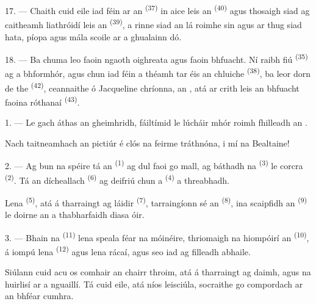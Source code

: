 17. --- Chaith cuid eile iad féin ar an 
\textsuperscript{(37)} in aice leis an  \textsuperscript{(40)}
agus thosaigh siad ag caitheamh liathróidí leis an 
\textsuperscript{(39)}, a rinne siad an lá roimhe sin agus ar thug siad hata, píopa
agus mála scoile ar a ghualainn dó.

18. --- Ba chuma leo faoin ngaoth oighreata agus faoin bhfuacht. Ní raibh fiú
 \textsuperscript{(35)} ag a bhformhór, agus chun iad féin a théamh
tar éis an chluiche  \textsuperscript{(38)}, ba leor
dorn de  the \textsuperscript{(42)}, ceannaithe ó Jacqueline
chríonna, an , atá ar crith leis an bhfuacht faoina
 róthanaí \textsuperscript{(43)}.

\VUsaut{3.0mm}
\VUsaut{3.0mm}

\VUsaut{4.0mm}

1. --- Le gach áthas an gheimhridh, fáiltímid le lúcháir mhór roimh fhilleadh an
.

Nach taitneamhach an pictiúr é clós na feirme tráthnóna, i mí na Bealtaine!

2. --- Ag bun na spéire tá an  \textsuperscript{(1)} ag dul faoi go
mall, ag báthadh na  \textsuperscript{(3)} le 
corcra \textsuperscript{(2)}. Tá an  dícheallach
\textsuperscript{(6)} ag deifriú chun a  \textsuperscript{(4)} a
threabhadh.

Lena  \textsuperscript{(5)}, atá á tharraingt ag 
láidir \textsuperscript{(7)}, tarraingíonn sé an 
\textsuperscript{(8)}, ina scaipfidh an  \textsuperscript{(9)} le
doirne an  a thabharfaidh diasa óir.

3. --- Bhain na  \textsuperscript{(11)} lena speala féar na
móinéire, thriomaigh na hiompóirí an  \textsuperscript{(10)}, á
iompú lena  \textsuperscript{(12)} agus lena rácaí, agus seo iad ag
filleadh abhaile.

Siúlann cuid acu os comhair an chairr throim, atá á tharraingt ag daimh, agus na
huirlisí ar a nguaillí. Tá cuid eile, atá níos leisciúla, socraithe go
compordach ar an bhféar cumhra.

